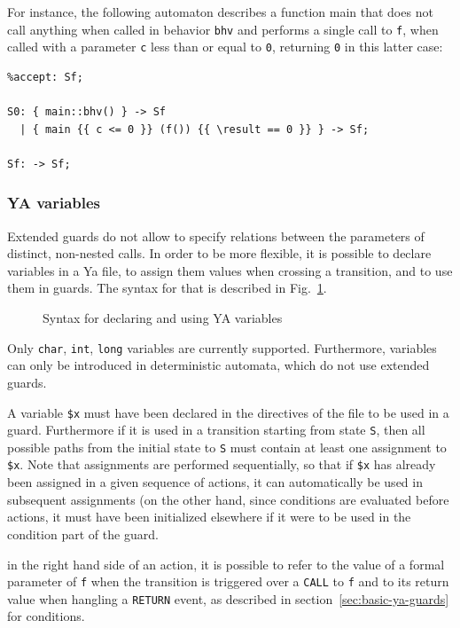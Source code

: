 \documentclass{report}
\begin{document}
For instance, the following automaton describes a function main that does not
call anything when called in behavior \lstinline|bhv| and performs a single call
to \lstinline|f|, when called with a parameter \lstinline|c| less than or 
equal to \lstinline|0|, returning \lstinline|0| in this latter case:
\begin{lstlisting}[language=ya]
%init: S0;
%accept: Sf;

S0: { main::bhv() } -> Sf
  | { main {{ c <= 0 }} (f()) {{ \result == 0 }} } -> Sf;

Sf: -> Sf;
\end{lstlisting}

\subsubsection{YA variables}
Extended guards do not allow to specify relations between the parameters of
distinct, non-nested calls. In order to be more flexible, it is possible to declare
variables in a Ya file, to assign them values when crossing a transition, and to use
them in guards. The syntax for that is described in Fig.~\ref{fig:ya-variables}.
\begin{figure}[htb]

\caption{Syntax for declaring and using YA variables}
\label{fig:ya-variables}
\end{figure}

Only \lstinline|char|, \lstinline|int|, \lstinline|long| variables are currently
supported. Furthermore, variables can only be introduced in deterministic automata,
which do not use extended guards.

A variable \lstinline|$x| %
must have been declared in the directives of the file to be used in a guard. Furthermore
if it is used in a transition starting from state \lstinline|S|, then all possible paths
from the initial state to \lstinline|S| must contain at least one assignment to \lstinline|$x|.
Note that assignments are performed sequentially, so that if
\lstinline|$x| has already been assigned in a given sequence of actions, it can automatically
be used in subsequent assignments (on the other hand, since conditions are evaluated
before actions, it must have been initialized elsewhere if it were to be used in the
condition part of the guard.

in the right hand side of an action, it is possible to refer to the value of a formal
parameter of \lstinline|f| when the transition is triggered over a \lstinline|CALL|
to \lstinline|f| and to its return value when hangling a \lstinline|RETURN| event,
as described in section~\ref{sec:basic-ya-guards} for conditions.
\end{document}
